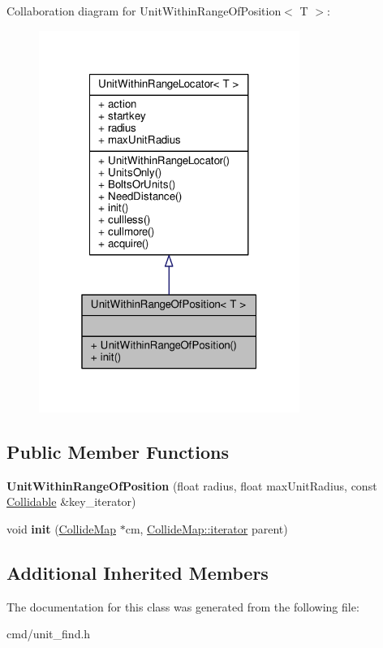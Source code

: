 Collaboration diagram for Unit\+Within\+Range\+Of\+Position$<$ T $>$\+:
\nopagebreak
\begin{figure}[H]
\begin{center}
\leavevmode
\includegraphics[width=241pt]{d0/d1c/classUnitWithinRangeOfPosition__coll__graph}
\end{center}
\end{figure}
\subsection*{Public Member Functions}
\begin{DoxyCompactItemize}
\item 
{\bfseries Unit\+Within\+Range\+Of\+Position} (float radius, float max\+Unit\+Radius, const \hyperlink{classCollidable}{Collidable} \&key\+\_\+iterator)\hypertarget{classUnitWithinRangeOfPosition_a9d2671b50354efea0246065591f8eca6}{}\label{classUnitWithinRangeOfPosition_a9d2671b50354efea0246065591f8eca6}

\item 
void {\bfseries init} (\hyperlink{classCollideMap}{Collide\+Map} $\ast$cm, \hyperlink{classCollidable}{Collide\+Map\+::iterator} parent)\hypertarget{classUnitWithinRangeOfPosition_a09d48bddb79568515eb82c6edeaba314}{}\label{classUnitWithinRangeOfPosition_a09d48bddb79568515eb82c6edeaba314}

\end{DoxyCompactItemize}
\subsection*{Additional Inherited Members}


The documentation for this class was generated from the following file\+:\begin{DoxyCompactItemize}
\item 
cmd/unit\+\_\+find.\+h\end{DoxyCompactItemize}
